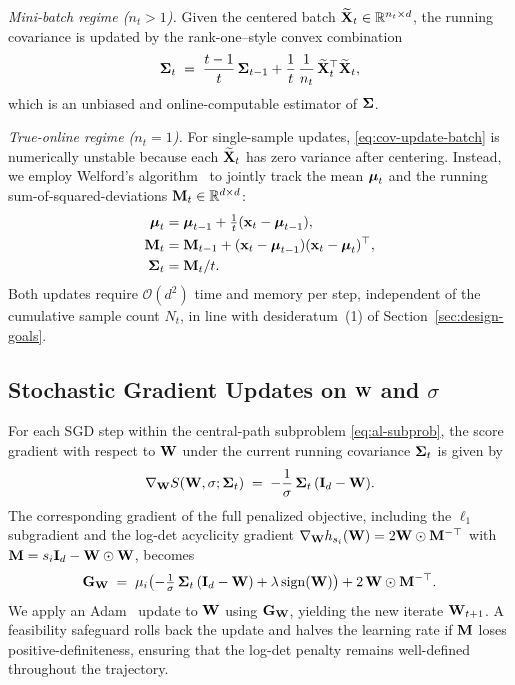 \documentclass[journal,twoside]{IEEEtran}
\begin{document}
\textit{Mini-batch regime ($n_t > 1$).} Given the centered batch
$\widetilde{{\mathbf X}}_t \in \mathbb{R}^{n_t \times d}$, the running
covariance is updated by the rank-one--style convex combination
\begin{equation}
\label{eq:cov-update-batch}
\boldsymbol{\Sigma}_t \;=\;
\frac{t - 1}{t}\,\boldsymbol{\Sigma}_{t-1}
+ \frac{1}{t}\,
\frac{1}{n_t}\,\widetilde{{\mathbf X}}_t^\top \widetilde{{\mathbf X}}_t,
\end{equation}
which is an unbiased and online-computable estimator of $\boldsymbol{\Sigma}$.

\textit{True-online regime ($n_t = 1$).} For single-sample updates,
\eqref{eq:cov-update-batch} is numerically unstable because each
$\widetilde{{\mathbf X}}_t$ has zero variance after centering. Instead, we
employ Welford's algorithm~\cite{welford1962} to jointly track the mean
$\boldsymbol{\mu}_t$ and the running sum-of-squared-deviations
${\mathbf M}_t \in \mathbb{R}^{d \times d}$:
\begin{align}
\label{eq:welford-mean}
\boldsymbol{\mu}_t       &= \boldsymbol{\mu}_{t-1} + \tfrac{1}{t}({\mathbf x}_t - \boldsymbol{\mu}_{t-1}), \\
\label{eq:welford-m2}
{\ensuremath{\mathbf M}}_t         &= {\mathbf M}_{t-1} + ({\mathbf x}_t - \boldsymbol{\mu}_{t-1})({\mathbf x}_t - \boldsymbol{\mu}_t)^\top, \\
\label{eq:welford-cov}
\boldsymbol{\Sigma}_t    &= {\mathbf M}_t / t.
\end{align}
Both updates require $\mathcal{O}(d^2)$ time and memory per step,
independent of the cumulative sample count $N_t$, in line with
desideratum~(1) of Section~\ref{sec:design-goals}.

\subsection{Stochastic Gradient Updates on ${\mathbf W}$ and $\sigma$}
\label{sec:sgd-updates}
For each SGD step within the central-path subproblem
\eqref{eq:al-subprob}, the score gradient with respect to ${\mathbf W}$
under the current running covariance $\boldsymbol{\Sigma}_t$ is given by
\begin{equation}
\label{eq:grad-w}
\nabla_{{\mathbf W}} S({\mathbf W}, \sigma; \boldsymbol{\Sigma}_t)
\;=\; -\frac{1}{\sigma}\,\boldsymbol{\Sigma}_t\,({\mathbf I}_d - {\mathbf W}).
\end{equation}
The corresponding gradient of the full penalized objective, including
the $\ell_1$ subgradient and the log-det acyclicity gradient
$\nabla_{{\mathbf W}} h_{s_i}({\mathbf W}) = 2 {\mathbf W} \odot {\ensuremath{\mathbf M}}^{-\top}$ with
${\mathbf M} = s_i {\mathbf I}_d - {\mathbf W} \odot {\ensuremath{\mathbf W}}$, becomes
\begin{equation}
\label{eq:full-grad-w}
{\ensuremath{\mathbf G}}_{{\mathbf W}}
\;=\; \mu_i\!\left( -\tfrac{1}{\sigma}\,\boldsymbol{\Sigma}_t\,({\mathbf I}_d - {\mathbf W})
+ \lambda\,\mathrm{sign}({\mathbf W}) \right)
+ 2\,{\mathbf W} \odot {\ensuremath{\mathbf M}}^{-\top}.
\end{equation}
We apply an Adam~\cite{kingma2014adam} update to ${\mathbf W}$ using
${\mathbf G}_{{\mathbf W}}$, yielding the new iterate ${\mathbf W}_{t+1}$. A
feasibility safeguard rolls back the update and halves the learning
rate if ${\mathbf M}$ loses positive-definiteness, ensuring that the log-det
penalty remains well-defined throughout the trajectory.
\end{document}
